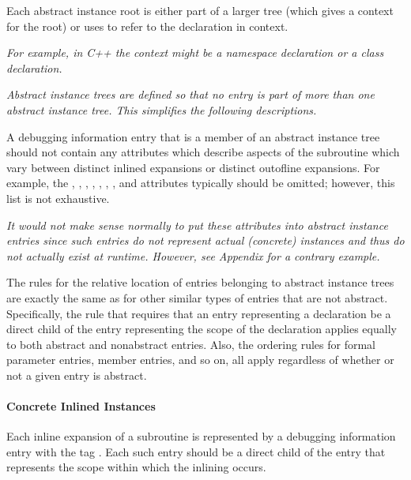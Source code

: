 Each abstract instance root is either part of a larger
tree (which gives a context for the root) or uses
 to refer to the declaration in context.

\textit{For example, in C++ the context might be a namespace
declaration or a class declaration.}

\textit{Abstract instance trees are defined so that no entry is part
of more than one abstract instance tree. This simplifies the
following descriptions.}

A debugging information entry that is a member of an abstract
instance tree should not contain any attributes which describe
aspects of the subroutine which vary between distinct inlined
expansions or distinct out\dash of\dash line expansions. For example,
the ,
, , 
, ,
, , and 
attributes typically should be omitted; however, this list
is not exhaustive.

\textit{It would not make sense normally to put these attributes into
abstract instance entries since such entries do not represent
actual (concrete) instances and thus do not actually exist at
run\dash time.  However, 
see Appendix  
for a contrary example.}

The rules for the relative location of entries belonging to
abstract instance trees are exactly the same as for other
similar types of entries that are not abstract. Specifically,
the rule that requires that an entry representing a declaration
be a direct child of the entry representing the scope of the
declaration applies equally to both abstract and non\dash abstract
entries. Also, the ordering rules for formal parameter entries,
member entries, and so on, all apply regardless of whether
or not a given entry is abstract.

\paragraph{Concrete Inlined Instances}
\label{chap:concreteinlinedinstances}

Each inline expansion of a subroutine is represented
by a debugging information entry with the 
tag . 
Each such entry should be a direct
child of the entry that represents the scope within which
the inlining occurs.

